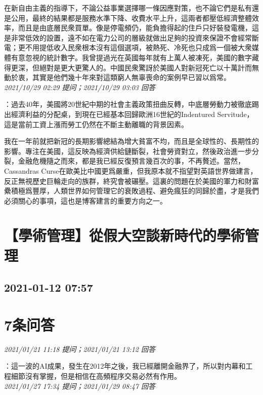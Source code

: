 \documentclass[twocolumn]{ctexart}
\begin{document}
在新自由主義的指導下，不論公益事業選擇哪一條因應對策，也不論它們是私有還是公用，最終的結果都是服務水準下降、收費水平上升，這兩者都壓低經濟整體效率，而且是由底層民衆買單。像是停電頻仍，能負擔得起的住戶只好裝發電機，這是非常低效的設置，遠不如在電力公司的層級就做出足夠的投資來保證不會經常斷電；更不用提低收入民衆根本沒有這個選項，被熱死、冷死也只成爲一個被大衆媒體有意忽視的統計數字。我曾提過光在英國每年就有上萬人被凍死，美國的數字藏得更深，但絕對是更大更驚人的。中國民衆驚訝於美國人對新冠死亡以十萬計而無動於衷，其實是他們幾十年來對這類窮人無辜喪命的案例早已習以爲常。
\\

\textit{\hfill\noindent\small 2021/10/29 02:29 提问；2021/10/29 03:03 回答}

：過去40年，美國將20世紀中期的社會主義政策扭曲反轉，中底層勞動力被徹底踢出經濟利益的分配桌，到現在已經基本回歸歐洲16世紀的Indentured Servitude，這是當前工資上漲而勞工仍然在不斷主動離職的背景因素。

我在一年前就把新冠的長期影響總結為增大貧富不均，而且是全球性的、長期性的影響。專注在美國，這反映為經濟供給鏈斷裂，社會勞資對立，然後政治進一步分裂，金融危機隨之而來，都是我已經反復預言幾百次的事，不再贅述。當然，Cassandras Curse在歐美比中國更爲嚴重，但我原本就不指望對英語世界做建言，反正無視歷史巨輪走向的族群，終究會被碾壓。這裏的問題在於美國的軍力和財富纍積極爲豐厚，人類世界如何管理它的衰敗過程、避免瘋狂的同歸於盡，才是我們必須關心的事項，這也是博客建言的重要方向之一。
\\


\section{【學術管理】從假大空談新時代的學術管理}
\subsection{2021-01-12 07:57}


\section{7条问答}

\textit{\hfill\noindent\small 2021/01/21 11:18 提问；2021/01/21 13:12 回答}

：這一波的AI成果，發生在2012年之後，我已經離開金融界了，所以對内幕和工程細節沒有掌握，但是相信在高頻程序交易必然有作用。
\\

\textit{\hfill\noindent\small 2021/01/27 17:34 提问；2021/01/29 08:47 回答}
\end{document}
